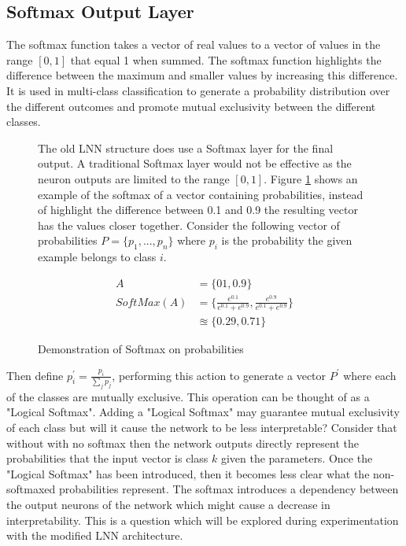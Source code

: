 \subsection{Softmax Output Layer}
The softmax function takes a vector of real values to a vector of values in the range $[0,1]$ that equal 1 when summed. The softmax function highlights the difference between the maximum and smaller values by increasing this difference. It is used in multi-class classification to generate a probability distribution over the different outcomes and promote mutual exclusivity between the different classes.
\begin{figure}[H]
\begin{minipage}[t]{0.57\textwidth}
	\vspace{0px}
	The old LNN structure does use a Softmax layer for the final output. A traditional Softmax layer would not be effective as the neuron outputs are limited to the range $[0,1]$. Figure \ref{fig:softmax-failure} shows an example of the softmax of a vector containing probabilities, instead of highlight the difference between 0.1 and 0.9 the resulting vector has the values closer together. Consider the following vector of probabilities $P = \{p_1, ..., p_n\}$ where $p_i$ is the probability the given example belongs to class $i$.
\end{minipage}
\hspace{3px}
\begin{minipage}[t]{0.4\textwidth}
\vspace{0px}
	\begin{align*}
		A &= \{01, 0.9\}\\
		SoftMax(A) &= \{ \frac{e^{0.1}}{e^{0.1} + e^{0.9}}, \frac{e^{0.9}}{e^{0.1} + e^{0.9}} \}\\
		&\approxeq \{ 0.29, 0.71 \}
	\end{align*}
\caption{Demonstration of Softmax on probabilities}
\label{fig:softmax-failure}

\end{minipage}
\end{figure}

 Then define $p_i^{'} = \frac{p_i}{\sum_j p_j}$, performing this action to generate a vector $P^{'}$ where each of the classes are mutually exclusive. This operation can be thought of as a "Logical Softmax". Adding a "Logical Softmax" may guarantee mutual exclusivity of each class but will it cause the network to be less interpretable? Consider that without with no softmax then the network outputs directly represent the probabilities that the input vector is class $k$ given the parameters. Once the "Logical Softmax" has been introduced, then it becomes less clear what the non-softmaxed probabilities represent. The softmax introduces a dependency between the output neurons of the network which might cause a decrease in interpretability. This is a question which will be explored during experimentation with the modified LNN architecture.

